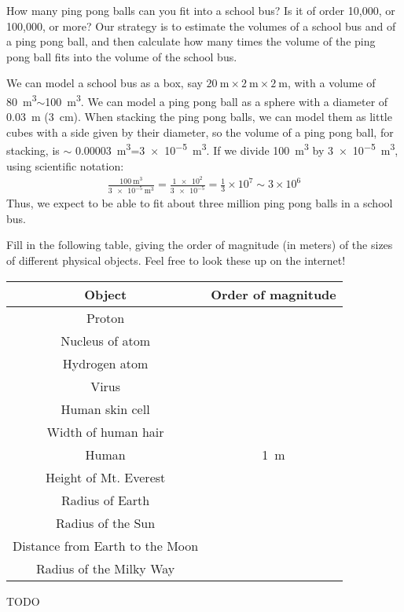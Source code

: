\begin{example}{How many ping pong balls can you fit into a school bus? Is it of order 10,000, or 100,000, or more?}
Our strategy is to estimate the volumes of a school bus and of a ping pong ball, and then calculate how many times the volume of the ping pong ball fits into the volume of the school bus.

We can model a school bus as a box, say $\SI{20}{\meter}\times \SI{2}{\meter}\times\SI{2}{\meter}$, with a volume of \SI{80}{\meter\cubed}$\sim$\SI{100}{\meter\cubed}. We can model a ping pong ball as a sphere with a diameter of \SI{0.03}{\meter} (\SI{3}{\centi\meter}). When stacking the ping pong balls, we can model them as little cubes with a side given by their diameter, so the volume of a ping pong ball, for stacking, is $\sim$ \SI{0.00003}{\meter\cubed}=\SI{3e-5}{\meter\cubed}. If we divide \SI{100}{\meter\cubed} by \SI{3e-5}{\meter\cubed}, using scientific notation:
\begin{align*}
\frac{\SI{100}{\meter\cubed}}{\SI{3e-5}{\meter\cubed}}=\frac{\num{1e2}}{\num{3e-5}}=\frac{1}{3}\times 10^7\sim 3\times 10^6
\end{align*}
Thus, we expect to be able to fit about three million ping pong balls in a school bus. 


\end{example}


\begin{checkpoint}{Fill in the following table, giving the order of magnitude (in meters) of the sizes of different physical objects. Feel free to look these up on the internet!}
\begin{center}
\begin{tabular}{|c|c|}
\hline  
\textbf{Object}&\textbf{Order of magnitude}\\
\hline
Proton&\\ \hline 
Nucleus of atom&\\ \hline
Hydrogen atom&\\ \hline
Virus&\\ \hline
Human skin cell&\\ \hline
Width of human hair&\\ \hline
Human &\SI{1}{\meter}\\ \hline
Height of Mt. Everest&\\ \hline
Radius of Earth&\\ \hline
Radius of the Sun&\\ \hline
Distance from Earth to the Moon&\\ \hline
Radius of the Milky Way&\\ \hline
\end{tabular}
\end{center}
\begin{answer}
TODO
\end{answer}
\end{checkpoint}



